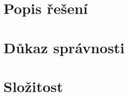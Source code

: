 \documentclass{scrartcl}
\begin{document}
\section{Popis řešení}

\section{Důkaz správnosti}

\section{Složitost}
\end{document}
